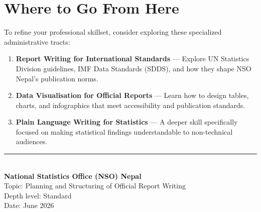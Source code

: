 \documentclass[11pt,a4paper,oneside]{book}
\begin{document}
\section{Where to Go From Here}

To refine your professional skillset, consider exploring these specialized administrative tracts:

\begin{enumerate}
    \item \textbf{Report Writing for International Standards} --- Explore UN Statistics Division guidelines, IMF Data Standards (SDDS), and how they shape NSO Nepal's publication norms.
    \item \textbf{Data Visualisation for Official Reports} --- Learn how to design tables, charts, and infographics that meet accessibility and publication standards.
    \item \textbf{Plain Language Writing for Statistics} --- A deeper skill specifically focused on making statistical findings understandable to non-technical audiences.
\end{enumerate}

\vspace{2cm}
\begin{center}
    \color{gray}
    \small
    \rule{6cm}{0.5pt}\\
    \vspace{0.2cm}
    \textbf{National Statistics Office (NSO) Nepal}\\
    Topic: Planning and Structuring of Official Report Writing\\
    Depth level: Standard\\
    Date: June 2026
\end{center}
\end{document}
